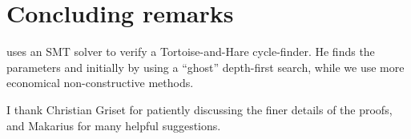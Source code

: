 \documentclass[11pt,a4paper]{article}
\begin{document}


\section{Concluding remarks}

\citet{DBLP:conf/vmcai/Leino12} uses an SMT solver to verify a
Tortoise-and-Hare cycle-finder. He finds the parameters 
and  initially by using a ``ghost'' depth-first search, while
we use more economical non-constructive methods.

I thank Christian Griset for patiently discussing the finer details of
the proofs, and Makarius for many helpful suggestions.



\end{document}
